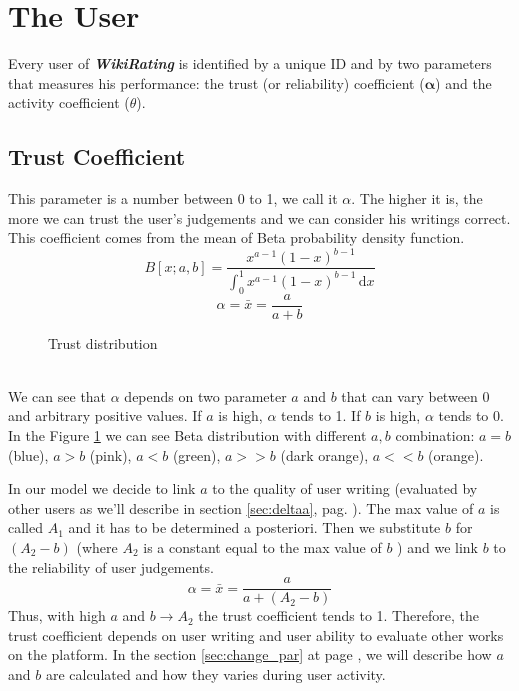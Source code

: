 \documentclass[a4paper,11pt]{article}
\newcommand{\wir}{\textbf{\textit{WikiRating }}}
\begin{document}
\newpage
\section{The User} \label{sec:user}
Every user of \wir is identified by a unique ID and by two parameters that measures his 
performance: the trust (or reliability) coefficient ($\mathbf{\alpha}$) and the activity 
coefficient ($\theta$).

\subsection{Trust Coefficient}
 This parameter is a number between 0 to 1, we call it $
\alpha$. The higher it is, the more we can trust the user's judgements and we can consider 
his writings correct.  This coefficient comes from the mean of Beta probability density 
function.
\begin{equation}
B[x;a,b] = \frac{x^{a-1}\left(1-x\right)^{b-1}}{\displaystyle{\int_0^1 x^{a-1}\left(1-x\right)^{b-1}\, \mathrm{d}x}}
\end{equation}
\begin{equation}
\alpha =\bar{x} = \frac{a}{a+b}
\end{equation}
\begin{figure}[!hpt]
\centering

\caption{Trust distribution}
\label{fig:beta}
\end{figure}
\\ We can see that $\alpha$ depends on two parameter $a$ and $b$ that can vary  between 0 
and arbitrary positive values. If $a$ is high, $\alpha$ tends to 1. If $b$ is high, $
\alpha$ tends to 0. In the Figure \ref{fig:beta} we can see Beta distribution with 
different $a,b$ combination: $a = b$ (blue), $a>b$ (pink), $a<b$ (green), $a>>b$ (dark 
orange), $a<<b$ (orange).

In our model we decide to link $a$ to the quality of user writing (evaluated by other 
users as we'll describe in section \ref{sec:deltaa}, pag. \pageref{sec:deltaa}). The max value of $a$ is called $A_1$ and it has to be determined a posteriori. Then we substitute $b$ for $(A_2 - b)$ (where $A_2$ is a constant equal to the max value of $b$ ) 
and we link $b$ to the reliability of user judgements.
\begin{equation}
\alpha =\bar{x} = \frac{a}{a+\left(A_2 - b\right)}
\end{equation} Thus, with high $a$ and $b \rightarrow A_2$ the 
trust coefficient tends to 1. Therefore, the trust coefficient depends on user writing and 
user ability to evaluate other works on the platform. In the section \ref{sec:change_par} at page \pageref{sec:change_par}, we will describe how $a$ and $b$ are calculated and how they varies during user activity. 
\end{document}
